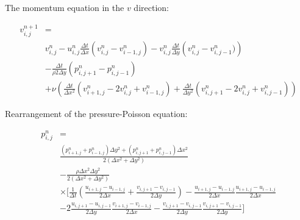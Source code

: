 \documentclass{article}
\begin{document}
\noindent The momentum equation in the $v$ direction:

\begin{equation}
	\begin{aligned}
		v_{i,j}^{n+1} & =                                                   \\
		              & v_{i,j}^{n} - u_{i,j}^{n} \frac{\Delta t}{\Delta x}
		\left(v_{i,j}^{n}-v_{i-1,j}^{n}\right) - v_{i,j}^{n} \frac{\Delta t}{\Delta y}
		\left(v_{i,j}^{n}-v_{i,j-1}^{n})\right)                             \\
		              & - \frac{\Delta t}{\rho 2\Delta y}
		\left(p_{i,j+1}^{n}-p_{i,j-1}^{n}\right)                            \\
		              & + \nu \left(\frac{\Delta t}{\Delta x^2}
		\left(v_{i+1,j}^{n}-2v_{i,j}^{n}+v_{i-1,j}^{n}\right) + \frac{\Delta t}{\Delta
				y^2} \left(v_{i,j+1}^{n}-2v_{i,j}^{n}+v_{i,j-1}^{n}\right)\right)
	\end{aligned}
\end{equation}

\noindent  Rearrangement of the pressure-Poisson equation:

\begin{equation}
	\begin{aligned}
		p_{i,j}^{n} & =                                                                        \\
		            & \frac{\left(p_{i+1,j}^{n}+p_{i-1,j}^{n}\right) \Delta y^2 +
			\left(p_{i,j+1}^{n}+p_{i,j-1}^{n}\right) \Delta x^2}{2\left(\Delta x^2+\Delta
		y^2\right)}                                                                            \\
		            & -\frac{\rho\Delta x^2\Delta y^2}{2\left(\Delta x^2+\Delta y^2\right)}    \\
		            & \times \biggr[\frac{1}{\Delta t}\left(\frac{u_{i+1,j}-u_{i-1,j}}{2\Delta
			x}+\frac{v_{i,j+1}-v_{i,j-1}}{2\Delta y}\right)
		-\frac{u_{i+1,j}-u_{i-1,j}}{2\Delta x}\frac{u_{i+1,j}-u_{i-1,j}}{2\Delta x}            \\
		            & - 2\frac{u_{i,j+1}-u_{i,j-1}}{2\Delta
		y}\frac{v_{i+1,j}-v_{i-1,j}}{2\Delta x}- \frac{v_{i,j+1}-v_{i,j-1}}{2\Delta
		y}\frac{v_{i,j+1}-v_{i,j-1}}{2\Delta y}\biggr]
	\end{aligned}
\end{equation}
\linebreak
\linebreak
\end{document}
